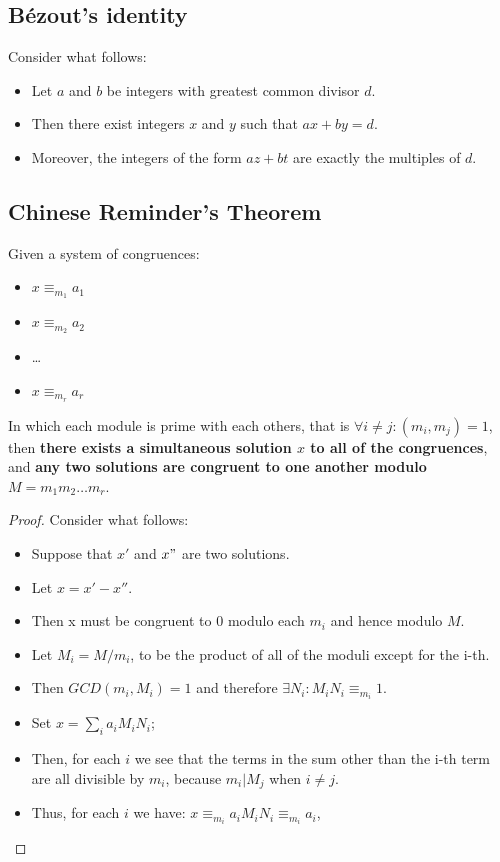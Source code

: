 \subsection{Bézout's identity}
\begin{theorem}
    Consider what follows:
    \begin{itemize}
        \item Let $a$ and $b$ be integers with greatest common divisor $d$.
        \item Then there exist integers $x$ and $y$ such that $ax + by = d$.
        \item Moreover, the integers of the form $az + bt$ are exactly the multiples of $d$.
    \end{itemize}
\end{theorem}

\subsection{Chinese Reminder's Theorem}
\begin{theorem}
    Given a system of congruences:
    \begin{itemize}
        \item $x \equiv_{m_{1}} a_{1}$
        \item $x \equiv_{m_{2}} a_{2}$
        \item \dots
        \item $x \equiv_{m_{r}} a_{r}$
    \end{itemize}
    In which each module is prime with each others, that is $\forall i \neq j: (m_{i}, m_{j}) = 1$,
    then \textbf{there exists a simultaneous solution $x$ to all of the congruences}, and \textbf{any two solutions are congruent to one another modulo $M = m_{1}m_{2}\dots m_{r}$}.
\end{theorem}

\begin{proof}
    Consider what follows:
    \begin{itemize}
        \item Suppose that $x'$ and $x"$ are two solutions.
        \item Let $x = x' - x''$.
        \item Then x must be congruent to $0$ modulo each $m_{i}$ and hence modulo $M$.
        \item Let $M_{i} = M/m_{i}$, to be the product of all of the moduli except for the i-th.
        \item Then $GCD(m_{i}, M_{i}) = 1$ and therefore $\exists N_{i}: M_{i}N_{i} \equiv_{m_{i}} 1$.
        \item Set $x = \sum_{i}a_{i}M_{i}N_{i}$;
        \item Then, for each $i$ we see that the terms in the sum other than the i-th term are all divisible by $m_{i}$, because $m_{i} | M_{j}$ when $i \neq j$.
        \item Thus, for each $i$ we have: $x \equiv_{m_{i}} a_{i}M_{i}N_{i} \equiv_{m_{i}} a_{i}$,
    \end{itemize}
\end{proof}


